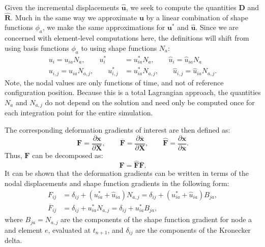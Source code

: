 Given the incremental displacements $\hat{\bm{u}}$, we seek to compute the quantities $\bm{D}$ and $\hat{\bm{R}}$. Much in the same way we approximate $\bm{u}$ by a linear combination of shape functions $\phi_a$, we make the same approximations for $\bm{u}^*$ and $\hat{\bm{u}}$. Since we are concerned with element-level computations here, the definitions will shift from using basis functions $\phi_a$ to using shape functions $N_a$:
\begin{align}
u_i = u_{ia}N_a, \qquad u^*_i &= u^*_{ia}N_a, \qquad \hat{u}_i = \hat{u}_{ia}N_a \\
u_{i,j} = u_{ia}N_{a,j}, \qquad u^*_{i,j} &= u^*_{ia}N_{a,j}, \qquad \hat{u}_{i,j} = \hat{u}_{ia}N_{a,j}.
\end{align}
Note, the nodal values are only functions of time, and not of reference configuration position. Because this is a total Lagrangian approach, the quantities $N_a$ and $N_{a,j}$ do not depend on the solution and need only be computed once for each integration point for the entire simulation.

The corresponding deformation gradients of interest are then defined as:
\begin{equation}
\bm{F} = \frac{\partial \bm{x}}{\partial \bm{X}}, \qquad \overline{\bm{F}} = \frac{\partial \overline{\bm{x}}}{\partial \bm{X}}, \qquad \hat{\bm{F}} = \frac{\partial \bm{x}}{\partial \overline{\bm{x}}}.
\end{equation}
Thus, $\bm{F}$ can be decomposed as:
\begin{equation}
\bm{F} = \hat{\bm{F}}\overline{\bm{F}}.
\end{equation}
It can be shown that the deformation gradients can be written in terms of the nodal displacements and shape function gradients in the following form:
\begin{align}
F_{ij} &= \delta_{ij} + \left(u^*_{ia} + \hat{u}_{ia} \right) N_{a,j} = \delta_{ij} + \left(u^*_{ia} + \hat{u}_{ia} \right) B_{ja}, \\
\overline{F}_{ij} &= \delta_{ij} + u^*_{ia} N_{a,j} = \delta_{ij} + u^*_{ia} B_{ja},
\end{align}
where $B_{ja} = N_{a,j}$ are the components of the shape function gradient for node a and element $e$, evaluated at $t_{n+1}$, and $\delta_{ij}$ are the components of the Kronecker delta.

